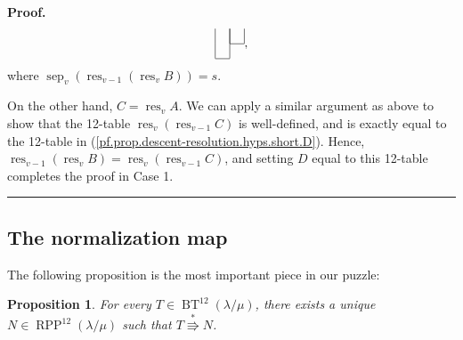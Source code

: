 \documentclass[12pt]{article}
\theoremstyle{plain}
\newtheorem{proposition}[theorem]{Proposition}
\theoremstyle{definition}
\newenvironment{proof}[1][Proof]{\noindent\textbf{#1.} }{\ \rule{0.5em}{0.5em}}
\def\OneTwoRPP{{\operatorname{RPP}^{12}\left(  \lambda/\mu\right)}}
\def\BenignTables{{\operatorname{BT}^{12}\left(  \lambda/\mu\right)}}
\begin{document}
\begin{proof}
\begin{equation}
\begin{tabular}{ccc}
\cline{3-3} \multicolumn{1}{|c|}{} & \multicolumn{1}{|c|}{} \\
\cline{2-2} \multicolumn{1}{|c|}{} \\
\cline{1-1}
\end{tabular}%
, \label{pf.prop.descent-resolution.hyps.short.D}%
\end{equation}
where $\operatorname*{sep}\nolimits_{v} \left( \operatorname*{res}\nolimits_{v-1}\left(  \operatorname*{res}\nolimits_{v}%
B\right) \right) = s$.

On the other hand, $C = \operatorname*{res}\nolimits_{v}A$. We can apply a similar argument as above to show that the 12-table $\operatorname*{res}\nolimits_{v}\left(
\operatorname*{res}\nolimits_{v-1}C\right)  $ is well-defined, and is exactly equal to the 12-table in (\ref{pf.prop.descent-resolution.hyps.short.D}).
Hence, $\operatorname*{res}%
\nolimits_{v-1}\left(  \operatorname*{res}\nolimits_{v}B\right) = \operatorname*{res}\nolimits_{v}\left(
\operatorname*{res}\nolimits_{v-1}C\right)$, and setting $D$ equal to this 12-table completes the proof in Case 1.
\end{proof}

\subsection{The normalization map}

The following proposition is the most important piece in our puzzle:

\begin{proposition}
\label{prop.BK.norm}For every $T\in\BenignTables$, there exists a unique
$N\in\OneTwoRPP$ such that $T\overset{\ast}{\Rrightarrow}N$.
\end{proposition}
\end{document}
